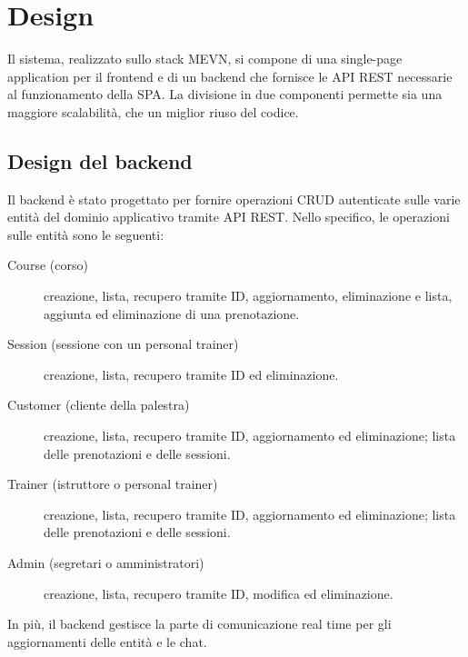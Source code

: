 \documentclass{report}
\begin{document}
\section{Design}
\par Il sistema, realizzato sullo stack MEVN, si compone di una single-page application per il frontend e di un backend che fornisce le API REST \citep{rest} necessarie al funzionamento della SPA. La divisione in due componenti permette sia una maggiore scalabilità, che un miglior riuso del codice.
\subsection{Design del backend}
\par Il backend è stato progettato per fornire operazioni CRUD autenticate sulle varie entità del dominio applicativo tramite API REST. Nello specifico, le operazioni sulle entità sono le seguenti:
\begin{description}
    \item[Course (corso)] creazione, lista, recupero tramite ID, aggiornamento, eliminazione e lista, aggiunta ed eliminazione di una prenotazione.
    \item[Session (sessione con un personal trainer)] creazione, lista, recupero tramite ID ed eliminazione.
    \item[Customer (cliente della palestra)] creazione, lista, recupero tramite ID, aggiornamento ed eliminazione; lista delle prenotazioni e delle sessioni.
    \item[Trainer (istruttore o personal trainer)] creazione, lista, recupero tramite ID, aggiornamento ed eliminazione; lista delle prenotazioni e delle sessioni.
    \item[Admin (segretari o amministratori)] creazione, lista, recupero tramite ID, modifica ed eliminazione.
\end{description}
\par In più, il backend gestisce la parte di comunicazione real time per gli aggiornamenti delle entità e le chat.
\end{document}
